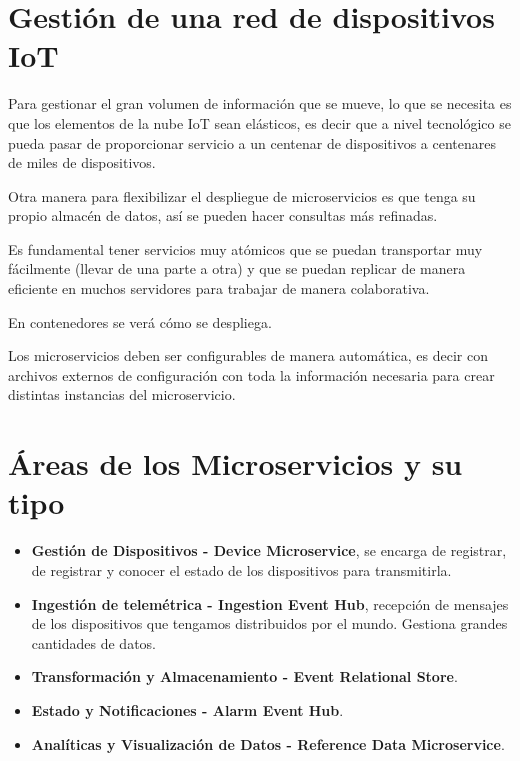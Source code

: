 \documentclass[12pt, twoside, openright]{report} %
\begin{document}
\section{Gestión de una red de dispositivos IoT}
Para gestionar el gran volumen de información que se mueve, lo que se necesita es que los elementos de la nube IoT sean elásticos, es decir que a nivel tecnológico se pueda pasar de proporcionar servicio a un centenar de dispositivos a centenares de miles de dispositivos.

Otra manera para flexibilizar el despliegue de microservicios es que tenga su propio almacén de datos, así se pueden hacer consultas más refinadas.

Es fundamental tener servicios muy atómicos que se puedan transportar muy fácilmente (llevar de una parte a otra) y que se puedan replicar de manera eficiente en muchos servidores para trabajar de manera colaborativa.

En contenedores se verá cómo se despliega.

Los microservicios deben ser configurables de manera automática, es decir con archivos externos de configuración con toda la información necesaria para crear distintas instancias del microservicio.

\section{Áreas de los Microservicios y su tipo}
\begin{itemize}
	\item \textbf{Gestión de Dispositivos - Device Microservice}, se encarga de registrar, de registrar y conocer el estado de los dispositivos para transmitirla.
	\item \textbf{Ingestión de telemétrica - Ingestion Event Hub}, recepción de mensajes de los dispositivos que tengamos distribuidos por el mundo. Gestiona grandes cantidades de datos.
	\item \textbf{Transformación y Almacenamiento - Event Relational Store}.
	\item \textbf{Estado y Notificaciones - Alarm Event Hub}.
	\item \textbf{Analíticas y Visualización de Datos - Reference Data Microservice}.
\end{itemize}
\end{document}
